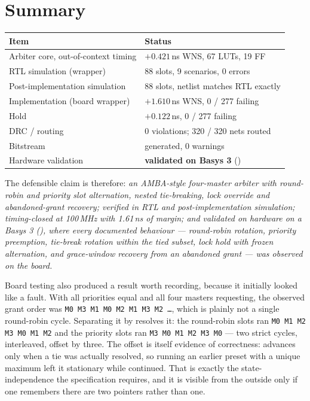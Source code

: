 \documentclass[11pt,a4paper]{article}
\newcommand{\sig}[1]{\texttt{\detokenize{#1}}}
\begin{document}
\section{Summary}

\begin{center}
\begin{tabular}{@{}ll@{}}
\toprule
\textbf{Item} & \textbf{Status} \\
\midrule
Arbiter core, out-of-context timing & $+0.421$\,ns WNS, 67 LUTs, 19 FF \\
RTL simulation (wrapper)            & 88 slots, 9 scenarios, 0 errors \\
Post-implementation simulation      & 88 slots, netlist matches RTL exactly \\
Implementation (board wrapper)      & $+1.610$\,ns WNS, 0 / 277 failing \\
Hold                                & $+0.122$\,ns, 0 / 277 failing \\
DRC / routing                       & 0 violations; 320 / 320 nets routed \\
Bitstream                           & generated, 0 warnings \\
Hardware validation                 & \textbf{validated on Basys 3} (\sig{xc7a35t}) \\
\bottomrule
\end{tabular}
\end{center}

\bigskip\noindent
The defensible claim is therefore: \emph{an AMBA-style four-master arbiter with
round-robin and priority slot alternation, nested tie-breaking, lock override
and abandoned-grant recovery; verified in RTL and post-implementation
simulation; timing-closed at 100\,MHz with 1.61\,ns of margin; and validated on
hardware on a Basys 3 (\sig{xc7a35tcpg236-1}), where every documented behaviour
--- round-robin rotation, priority preemption, tie-break rotation within the
tied subset, lock hold with frozen alternation, and grace-window recovery from
an abandoned grant --- was observed on the board.}

\medskip\noindent
Board testing also produced a result worth recording, because it initially
looked like a fault. With all priorities equal and all four masters requesting,
the observed grant order was \texttt{M0 M3 M1 M0 M2 M1 M3 M2 \ldots}, which is
plainly not a single round-robin cycle. Separating it by \sig{slot_type} resolves
it: the round-robin slots ran \texttt{M0 M1 M2 M3 M0 M1 M2} and the priority
slots ran \texttt{M3 M0 M1 M2 M3 M0} --- two strict cycles, interleaved, offset
by three. The offset is itself evidence of correctness: \sig{tie_ptr} advances
only when a tie was actually resolved, so running an earlier preset with a
unique maximum left it stationary while \sig{rr_ptr} continued. That is exactly
the state-independence the specification requires, and it is visible from the
outside only if one remembers there are two pointers rather than one.
\end{document}
